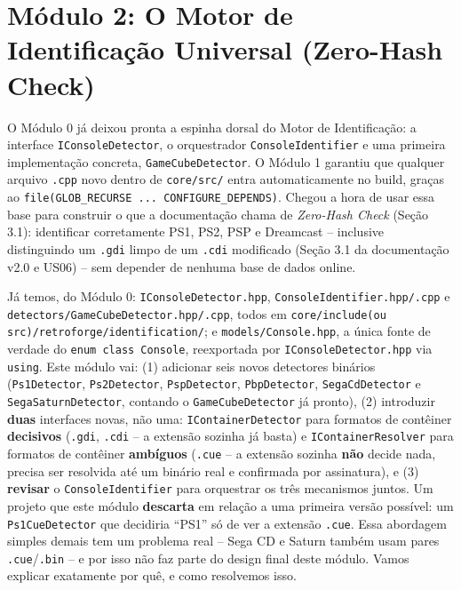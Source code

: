\section{Módulo 2: O Motor de Identificação Universal (Zero-Hash Check)}

O Módulo 0 já deixou pronta a espinha dorsal do Motor de Identificação: a interface \texttt{IConsoleDetector}, o orquestrador \texttt{ConsoleIdentifier} e uma primeira implementação concreta, \texttt{GameCubeDetector}. O Módulo 1 garantiu que qualquer arquivo \texttt{.cpp} novo dentro de \texttt{core/src/} entra automaticamente no build, graças ao \texttt{file(GLOB\_RECURSE ... CONFIGURE\_DEPENDS)}. Chegou a hora de usar essa base para construir o que a documentação chama de \textit{Zero-Hash Check} (Seção 3.1): identificar corretamente PS1, PS2, PSP e Dreamcast -- inclusive distinguindo um \texttt{.gdi} limpo de um \texttt{.cdi} modificado (Seção 3.1 da documentação v2.0 e US06) -- sem depender de nenhuma base de dados online.

\begin{CaixaInfo}[title={O que já existe vs. o que este módulo constrói}]
Já temos, do Módulo 0: \texttt{IConsoleDetector.hpp}, \texttt{ConsoleIdentifier.hpp/.cpp} e \texttt{detectors/GameCubeDetector.hpp/.cpp}, todos em \texttt{core/include(ou src)/retroforge/identification/}; e \texttt{models/Console.hpp}, a única fonte de verdade do \texttt{enum class Console}, reexportada por \texttt{IConsoleDetector.hpp} via \texttt{using}. Este módulo vai: (1) adicionar seis novos detectores binários (\texttt{Ps1Detector}, \texttt{Ps2Detector}, \texttt{PspDetector}, \texttt{PbpDetector}, \texttt{SegaCdDetector} e \texttt{SegaSaturnDetector}, contando o \texttt{GameCubeDetector} já pronto), (2) introduzir \textbf{duas} interfaces novas, não uma: \texttt{IContainerDetector} para formatos de contêiner \textbf{decisivos} (\texttt{.gdi}, \texttt{.cdi} -- a extensão sozinha já basta) e \texttt{IContainerResolver} para formatos de contêiner \textbf{ambíguos} (\texttt{.cue} -- a extensão sozinha \textbf{não} decide nada, precisa ser resolvida até um binário real e confirmada por assinatura), e (3) \textbf{revisar} o \texttt{ConsoleIdentifier} para orquestrar os três mecanismos juntos. Um projeto que este módulo \textbf{descarta} em relação a uma primeira versão possível: um \texttt{Ps1CueDetector} que decidiria ``PS1'' só de ver a extensão \texttt{.cue}. Essa abordagem simples demais tem um problema real -- Sega CD e Saturn também usam pares \texttt{.cue}/\texttt{.bin} -- e por isso não faz parte do design final deste módulo. Vamos explicar exatamente por quê, e como resolvemos isso.
\end{CaixaInfo}

